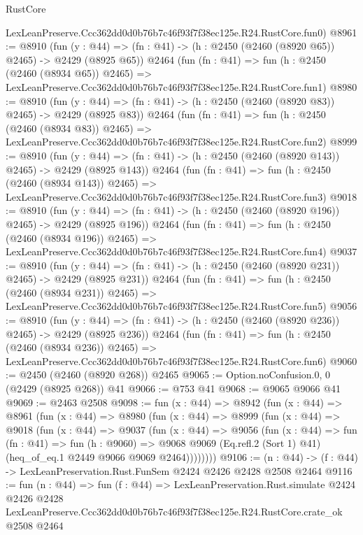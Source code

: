 \begin{lexlean}{RustCore}
\begin{coremodule}
    LexLeanPreserve.Ccc362dd0d0b76b7c46f93f7f38ec125e.R24.RustCore.fun0)
@8961 := @8910
    (fun (y : @44) => (fn : @41) -> (h : @2450 (@2460 (@8920 @65)) @2465) -> @2429 (@8925 @65))
    @2464
    (fun (fn : @41) =>
    fun (h : @2450 (@2460 (@8934 @65)) @2465) =>
    LexLeanPreserve.Ccc362dd0d0b76b7c46f93f7f38ec125e.R24.RustCore.fun1)
@8980 := @8910
    (fun (y : @44) => (fn : @41) -> (h : @2450 (@2460 (@8920 @83)) @2465) -> @2429 (@8925 @83))
    @2464
    (fun (fn : @41) =>
    fun (h : @2450 (@2460 (@8934 @83)) @2465) =>
    LexLeanPreserve.Ccc362dd0d0b76b7c46f93f7f38ec125e.R24.RustCore.fun2)
@8999 := @8910
    (fun (y : @44) => (fn : @41) -> (h : @2450 (@2460 (@8920 @143)) @2465) -> @2429 (@8925 @143))
    @2464
    (fun (fn : @41) =>
    fun (h : @2450 (@2460 (@8934 @143)) @2465) =>
    LexLeanPreserve.Ccc362dd0d0b76b7c46f93f7f38ec125e.R24.RustCore.fun3)
@9018 := @8910
    (fun (y : @44) => (fn : @41) -> (h : @2450 (@2460 (@8920 @196)) @2465) -> @2429 (@8925 @196))
    @2464
    (fun (fn : @41) =>
    fun (h : @2450 (@2460 (@8934 @196)) @2465) =>
    LexLeanPreserve.Ccc362dd0d0b76b7c46f93f7f38ec125e.R24.RustCore.fun4)
@9037 := @8910
    (fun (y : @44) => (fn : @41) -> (h : @2450 (@2460 (@8920 @231)) @2465) -> @2429 (@8925 @231))
    @2464
    (fun (fn : @41) =>
    fun (h : @2450 (@2460 (@8934 @231)) @2465) =>
    LexLeanPreserve.Ccc362dd0d0b76b7c46f93f7f38ec125e.R24.RustCore.fun5)
@9056 := @8910
    (fun (y : @44) => (fn : @41) -> (h : @2450 (@2460 (@8920 @236)) @2465) -> @2429 (@8925 @236))
    @2464
    (fun (fn : @41) =>
    fun (h : @2450 (@2460 (@8934 @236)) @2465) =>
    LexLeanPreserve.Ccc362dd0d0b76b7c46f93f7f38ec125e.R24.RustCore.fun6)
@9060 := @2450 (@2460 (@8920 @268)) @2465
@9065 := Option.noConfusion.{0, 0} (@2429 (@8925 @268)) @41
@9066 := @753 @41
@9068 := @9065 @9066 @41
@9069 := @2463 @2508
@9098 := fun (x : @44) =>
  @8942
    (fun (x : @44) =>
    @8961
      (fun (x : @44) =>
      @8980
        (fun (x : @44) =>
        @8999
          (fun (x : @44) =>
          @9018
            (fun (x : @44) =>
            @9037
              (fun (x : @44) =>
              @9056
                (fun (x : @44) =>
                fun (fn : @41) =>
                fun (h : @9060) =>
                @9068
                  @9069
                  (Eq.refl.{2} (Sort 1) @41)
                  (heq_of_eq.{1} @2449 @9066 @9069 @2464))))))))
@9106 := (n : @44) -> (f : @44) -> LexLeanPreservation.Rust.FunSem @2424 @2426 @2428 @2508 @2464
@9116 := fun (n : @44) =>
  fun (f : @44) =>
  LexLeanPreservation.Rust.simulate
    @2424
    @2426
    @2428
    LexLeanPreserve.Ccc362dd0d0b76b7c46f93f7f38ec125e.R24.RustCore.crate_ok
    @2508
    @2464
\end{coremodule}
\end{lexlean}
